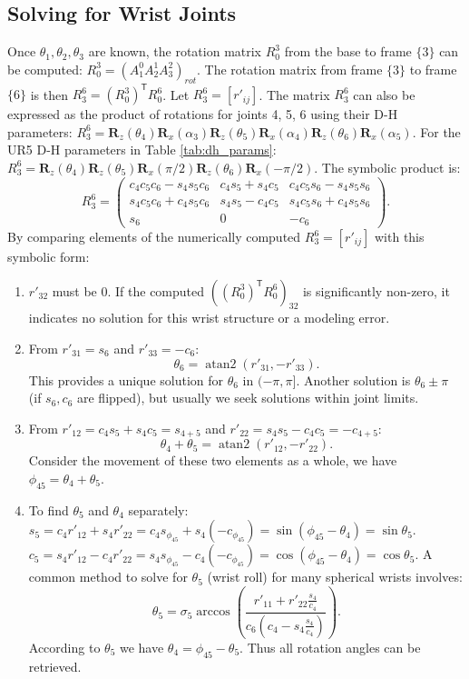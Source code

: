 \documentclass{article}
\newcommand{\mat}[1]{\begin{pmatrix} #1 \end{pmatrix}}
\newcommand{\T}{^\mathsf{T}}
\newcommand{\RotX}[1]{\mathbf{R}_x(#1)}
\newcommand{\RotZ}[1]{\mathbf{R}_z(#1)}
\newcommand{\atan}[2]{\operatorname{atan2}(#1, #2)}
\begin{document}
\subsection{Solving for Wrist Joints}
Once $\theta_1, \theta_2, \theta_3$ are known, the rotation matrix $R_0^3$ from the base to frame $\{3\}$ can be computed: $R_0^3 = (A_1^0 A_2^1 A_3^2)_{rot}$.
The rotation matrix from frame $\{3\}$ to frame $\{6\}$ is then $R_3^6 = (R_0^3)\T R_0^6$. Let $R_3^6 = [r'_{ij}]$.
The matrix $R_3^6$ can also be expressed as the product of rotations for joints 4, 5, 6 using their D-H parameters:
$R_3^6 = \RotZ{\theta_4}\RotX{\alpha_3} \RotZ{\theta_5}\RotX{\alpha_4} \RotZ{\theta_6}\RotX{\alpha_5}$.
For the UR5 D-H parameters in Table \ref{tab:dh_params}:
$R_3^6 = \RotZ{\theta_4} \RotZ{\theta_5}\RotX{\pi/2} \RotZ{\theta_6}\RotX{-\pi/2}$.
The symbolic product is:
\begin{equation}
R_3^6 = \mat{ c_4c_5c_6-s_4s_5c_6 & c_4s_5+s_4c_5 & c_4c_5s_6-s_4s_5s_6 \\ s_4c_5c_6+c_4s_5c_6 & s_4s_5-c_4c_5 & s_4c_5s_6+c_4s_5s_6 \\ s_6 & 0 & -c_6 }.
\end{equation}
By comparing elements of the numerically computed $R_3^6 = [r'_{ij}]$ with this symbolic form:
\begin{enumerate}
    \item $r'_{32}$ must be $0$. If the computed $( (R_0^3)\T R_0^6 )_{32}$ is significantly non-zero, it indicates no solution for this wrist structure or a modeling error.
    \item From $r'_{31} = s_6$ and $r'_{33} = -c_6$:
    \begin{equation}
    \theta_6 = \atan{r'_{31}}{-r'_{33}}.
    \end{equation}
    This provides a unique solution for $\theta_6$ in $(-\pi, \pi]$. Another solution is $\theta_6 \pm \pi$ (if $s_6, c_6$ are flipped), but usually we seek solutions within joint limits.
    \item From $r'_{12} = c_4s_5+s_4c_5 = s_{4+5}$ and $r'_{22} = s_4s_5-c_4c_5 = -c_{4+5}$:
    \begin{equation}
    \theta_4+\theta_5 = \atan{r'_{12}}{-r'_{22}}.
    \end{equation}
    Consider the movement of these two elements as a whole, we have $\phi_{45} = \theta_4+\theta_5$.
    \item To find $\theta_5$ and $\theta_4$ separately:
    $s_5 = c_4 r'_{12} + s_4 r'_{22} = c_4 s_{\phi_{45}} + s_4 (-c_{\phi_{45}}) = \sin(\phi_{45}-\theta_4) = \sin\theta_5$.
    $c_5 = s_4 r'_{12} - c_4 r'_{22} = s_4 s_{\phi_{45}} - c_4 (-c_{\phi_{45}}) = \cos(\phi_{45}-\theta_4) = \cos\theta_5$.
    A common method to solve for $\theta_5$ (wrist roll) for many spherical wrists involves:
    \begin{equation}
        \theta_5 = \sigma_5 \arccos\left( \frac{r'_{11} + r'_{22} \frac{s_4}{c_4} }{c_6(c_4 - s_4 \frac{s_4}{c_4})} \right).
    \end{equation}
    According to $\theta_5$ we have $\theta_4=\phi_{45}-\theta_5$. Thus all rotation angles can be retrieved.
\end{enumerate}
\end{document}
